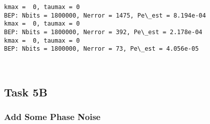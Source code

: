 \documentclass[11pt]{article}
\begin{document}
    \begin{Verbatim}[commandchars=\\\{\}]
kmax =  0, taumax = 0
BEP: Nbits = 1800000, Nerror = 1475, Pe\_est = 8.194e-04
kmax =  0, taumax = 0
BEP: Nbits = 1800000, Nerror = 392, Pe\_est = 2.178e-04
kmax =  0, taumax = 0
BEP: Nbits = 1800000, Nerror = 73, Pe\_est = 4.056e-05

    \end{Verbatim}

    \begin{center}
    \end{center}
    { \hspace*{\fill} \\}
    
    \subsection{Task 5B}\label{task-5b}

    \subsubsection{Add Some Phase Noise}\label{add-some-phase-noise}
\end{document}

